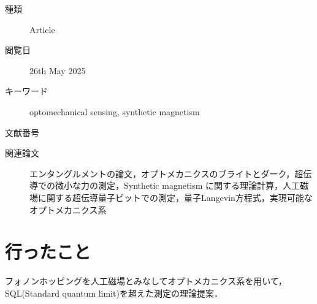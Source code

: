     \begin{boxnote}
      \begin{description}
        \item[種類] Article
        \item[閲覧日] 26th May 2025
        \item[キーワード] optomechanical sensing, synthetic magnetism
        \item[文献番号] \cite{PhysRevA.111.053508}
        \item[関連論文] エンタングルメントの論文\cite{PhysRevLett.129.063602}，オプトメカニクスのブライトとダーク\cite{lake2020two}，超伝導での微小な力の測定\cite{PhysRevLett.128.150501}，Synthetic magnetism に関する理論計算\cite{PhysRevLett.129.063602}，人工磁場に関する超伝導量子ビットでの測定\cite{massel2012multimode}，量子Langevin方程式\cite{PhysRevLett.46.1}，実現可能なオプトメカニクス系\cite{eichenfield2009picogram}
      \end{description}
    \end{boxnote}
    \section{行ったこと}
      フォノンホッピングを人工磁場とみなしてオプトメカニクス系を用いて，SQL(Standard quantum limit)を超えた測定の理論提案．
